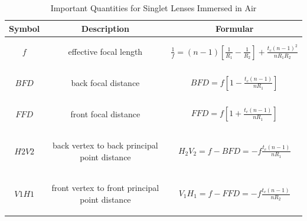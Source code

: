 \begin{table}
\centering
\caption{Important Quantities for Singlet Lenses Immersed in Air \cite{lens_theory_LC_Ltd}}
\begin{tabular}{|c|c|c|}
\hline
\textbf{Symbol}&\textbf{Description}&\textbf{Formular}\\
\hline
$f$ & \parbox[c]{6cm}{
						\begin{center}
						effective focal length
						\end{center}
				}& $\frac{1}{f}=(n-1)\left[\frac{1}{R_{1}}-\frac{1}{R_{2}} \right]+\frac{t_{c}(n-1)^2}{nR_{1}R_{2}}$ \\
\hline
$BFD$ &\parbox[c]{6cm}{
						\begin{center}
						back focal distance 
						\end{center}
			}& $BFD=f\left[ 1-\frac{t_{c}(n-1)}{nR_{1}}\right]$ \\
\hline
$FFD$ &\parbox[c]{6cm}{
						\begin{center}
						 front focal distance
						 \end{center} 
			}& $FFD=f\left[ 1+\frac{t_{c}(n-1)}{nR_{1}}\right]$ \\
\hline
$H2V2$ & \parbox[c]{6cm}{
						\begin{center}
						back vertex to back principal point distance
						\end{center}						
			} & $H_{2}V_{2}=f-BFD=-f\frac{t_{c}(n-1)}{nR_{1}}$ \\
\hline
$V1H1$ & \parbox[c]{6cm}{
						\begin{center}			
				    front vertex to front principal point distance
				    \end{center}
				 } & $V_{1}H_{1}=f-FFD=-f\frac{t_{c}(n-1)}{nR_{2}}$ \\
\hline
\end{tabular}
\label{tab:lens_quantities}
\end{table}

